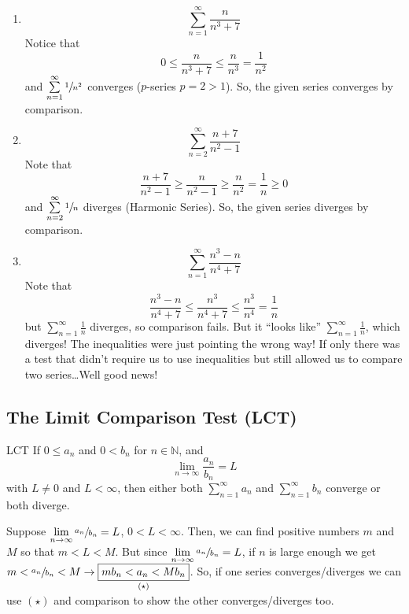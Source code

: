\begin{Example}{}{}
    \begin{enumerate}
        \item \[ \sum\limits_{n=1}^{\infty} \frac{n}{n^3+7} \]
              Notice that
              \[ 0\leqslant \frac{n}{n^3+7} \leqslant \frac{n}{n^3}=\frac{1}{n^2}  \]
              and $ \sum\limits_{n=1}^{\infty} \sfrac{1}{n^2} $ converges ($ p $-series $ p=2>1 $).
              So, the given series converges by comparison.
        \item \[ \sum\limits_{n=2}^{\infty} \frac{n+7}{n^2-1}  \]
              Note that
              \[ \frac{n+7}{n^2-1} \geqslant \frac{n}{n^2-1} \geqslant \frac{n}{n^2} =\frac{1}{n}
                  \geqslant 0 \]
              and $ \sum\limits_{n=2}^{\infty} \sfrac{1}{n} $ diverges (Harmonic Series). So,
              the given series diverges by comparison.
        \item \[ \sum\limits_{n=1}^{\infty} \frac{n^3-n}{n^4+7}  \]
              Note that
              \[ \frac{n^3-n}{n^4+7} \leqslant \frac{n^3}{n^4+7}\leqslant \frac{n^3}{n^4} =\frac{1}{n} \]
              but $ \sum\limits_{n=1}^{\infty} \frac{1}{n}  $ diverges, so comparison fails.
              But it ``looks like'' $ \sum\limits_{n=1}^{\infty} \frac{1}{n} $, which diverges!
              The inequalities were just pointing the wrong way! If only there was a test that didn't require
              us to use inequalities but still allowed us to compare two series\dots Well good news!
    \end{enumerate}
\end{Example}

\subsection{The Limit Comparison Test (LCT)}
\begin{Theorem}{LCT}{}
    If $ 0\leqslant a_n $ and $ 0<b_n $ for $ n\in\mathbb{N} $, and
    \[ \lim\limits_{{n} \to {\infty}} \frac{a_n}{b_n} =L \]
    with $ L\neq 0 $ and $ L<\infty $, then either both $ \sum\limits_{n=1}^{\infty} a_n $
    and $ \sum\limits_{n=1}^{\infty} b_n $ converge or both diverge.
\end{Theorem}

\begin{Proof}{}{}
    Suppose $ \lim\limits_{{n} \to {\infty}} \sfrac{a_n}{b_n} =L $, $ 0<L<\infty $. Then,
    we can find positive numbers $ m $ and $ M $ so that $ m<L<M $. But since
    $ \lim\limits_{{n} \to {\infty}} \sfrac{a_n}{b_n} =L $, if $ n $ is large
    enough we get $ m<\sfrac{a_n}{b_n} < M \rightarrow \underset{(\star)}{\boxed{mb_n<a_n<Mb_n}} $.
    So, if one series converges/diverges we can use $ (\star) $ and comparison
    to show the other converges/diverges too.
\end{Proof}

